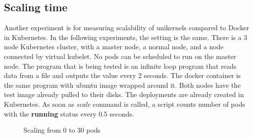 \subsection{Scaling time}
Another experiment is for measuring scalability of unikernels compared to Docker in Kubernetes. In the following experiments, the setting is the same. There is a 3 node Kubernetes cluster, with a master node, a normal node, and a node connected by virtual kubelet. No pods can be scheduled to run on the master node. The program that is being tested is an infinite loop program that reads data from a file and outputs the value every 2 seconds. The docker container is the same program with ubuntu image wrapped around it. Both nodes have the test image already pulled to their disks. The deployments are already created in Kubernetes. As soon as \textit{scale} command is called, a script counts number of pods with the \textbf{running} status every 0.5 seconds.

\begin{figure}[htpb]
  \centering
  \caption{Scaling from 0 to 30 pods}\label{fig:scale-up-30}
  \end{figure}

